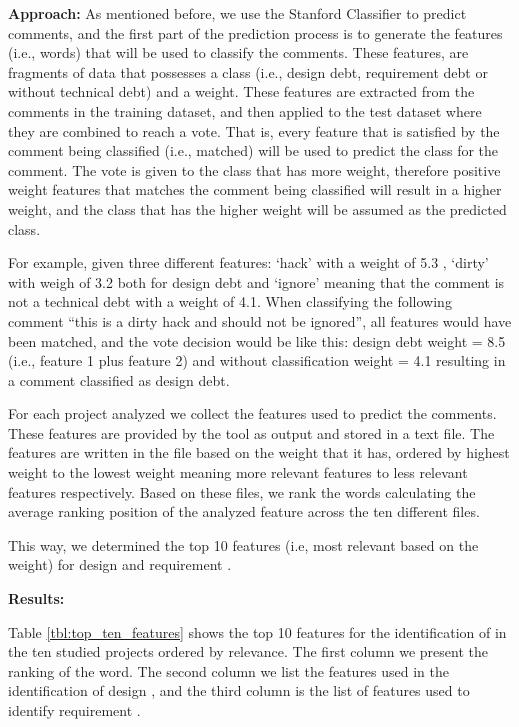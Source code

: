 \vspace{1mm}
\noindent \textbf{Approach:} As mentioned before, we use the Stanford Classifier to predict \SATD comments, and the first part of the prediction process is to generate the features (i.e., words) that will be used to classify the comments. These features, are fragments of data that possesses a class (i.e., design debt, requirement debt or without technical debt) and a weight. These features are extracted from the comments in the training dataset, and then applied to the test dataset where they are combined to reach a vote. That is, every feature that is satisfied by the comment being classified (i.e., matched) will be used to predict the class for the comment. The vote is given to the class that has more weight, therefore positive weight features that matches the comment being classified will result in a higher weight, and the class that has the higher weight will be assumed as the predicted class.

For example, given three different features: `hack' with a weight of 5.3 , `dirty' with weigh of 3.2 both for design debt and `ignore' meaning that the comment is not a technical debt with a weight of 4.1. When classifying the following comment ``this is a dirty hack and should not be ignored'', all features would have been matched, and the vote decision would be like this: design debt weight = 8.5 (i.e., feature 1 plus feature 2) and without classification weight = 4.1 resulting in a comment classified as  design debt.

For each project analyzed we collect the features used to predict the \SATD comments. These features are provided by the tool as output and stored in a text file. The features are written in the file based on the weight that it has, ordered by highest weight to the lowest weight meaning more relevant features to less relevant features respectively. Based on these files, we rank the words calculating the average ranking position of the analyzed feature across the ten different files. 

This way, we determined the top 10 features (i.e, most relevant based on the weight) for design \SATD and requirement \SATD.

\vspace{1mm}
\noindent \textbf{Results:} 

Table \ref{tbl:top_ten_features} shows the top 10 features for the identification of \SATD in the ten studied projects ordered by relevance. The first column we  present the ranking of the word. The second column we list the features used in the identification of design \SATD, and the third column is the list of features used to identify requirement \SATD.

